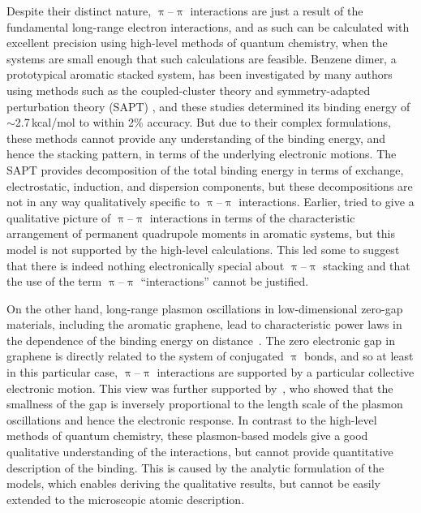 Despite their distinct nature, $\uppi$--$\uppi$ interactions are just a result of the fundamental long-range electron interactions, and as such can be calculated with excellent precision using high-level methods of quantum chemistry, when the systems are small enough that such calculations are feasible.
Benzene dimer, a prototypical aromatic stacked system, has been investigated by many authors using methods such as the coupled-cluster theory and symmetry-adapted perturbation theory (SAPT) \citep{HobzaJPC96,KimCR00,SinnokrotJACS02,SinnokrotJPCA06,DiStasioCPL07,PodeszwaJPCA06}, and these studies determined its binding energy of $\sim$2.7\,kcal/mol to within 2\% accuracy.
But due to their complex formulations, these methods cannot provide any understanding of the binding energy, and hence the stacking pattern, in terms of the underlying electronic motions.
The SAPT provides decomposition of the total binding energy in terms of exchange, electrostatic, induction, and dispersion components, but these decompositions are not in any way qualitatively specific to $\uppi$--$\uppi$ interactions.
Earlier, \citet{HunterJACS90} tried to give a qualitative picture of $\uppi$--$\uppi$ interactions in terms of the characteristic arrangement of permanent quadrupole moments in aromatic systems, but this model is not supported by the high-level calculations.
This led some to suggest that there is indeed nothing electronically special about $\uppi$--$\uppi$ stacking and that the use of the term $\uppi$--$\uppi$ ``interactions'' cannot be justified.

On the other hand, long-range plasmon oscillations in low-dimensional zero-gap materials, including the aromatic graphene, lead to characteristic power laws in the dependence of the binding energy on distance~\cite{DobsonPRL06,BordagPRB06}.
The zero electronic gap in graphene is directly related to the system of conjugated $\uppi$ bonds, and so at least in this particular case, $\uppi$--$\uppi$ interactions are supported by a particular collective electronic motion.
This view was further supported by~\citet{MisquittaPRB10}, who showed that the smallness of the gap is inversely proportional to the length scale of the plasmon oscillations and hence the electronic response.
In contrast to the high-level methods of quantum chemistry, these plasmon-based models give a good qualitative understanding of the interactions, but cannot provide quantitative description of the binding.
This is caused by the analytic formulation of the models, which enables deriving the qualitative results, but cannot be easily extended to the microscopic atomic description.

